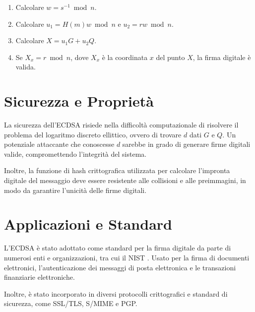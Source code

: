 \documentclass[a4paper,12pt]{report}
\begin{document}
\begin{enumerate}
    \item Calcolare $w = s^{-1} \bmod n$.
    \item Calcolare $u_1 = H(m)w \bmod n$ e $u_2 = rw \bmod n$.
    \item Calcolare $X = u_1G + u_2Q$.
    \item Se $X_x = r \bmod n$, dove $X_x$ è la coordinata $x$ del punto $X$, la firma digitale è valida.
\end{enumerate}

\section{Sicurezza e Proprietà}
La sicurezza dell'ECDSA risiede nella difficoltà computazionale di risolvere il problema del logaritmo discreto ellittico, ovvero di trovare $d$ dati $G$ e $Q$. Un potenziale attaccante che conoscesse $d$ sarebbe in grado di generare firme digitali valide, compromettendo l'integrità del sistema.

Inoltre, la funzione di hash crittografica utilizzata per calcolare l'impronta digitale del messaggio deve essere resistente alle collisioni e alle preimmagini, in modo da garantire l'unicità delle firme digitali.

\section{Applicazioni e Standard}
L'ECDSA è stato adottato come standard per la firma digitale da parte di numerosi enti e organizzazioni, tra cui il NIST \cite{nist}. Usato per la firma di documenti elettronici, l'autenticazione dei messaggi di posta elettronica e le transazioni finanziarie elettroniche.

Inoltre, è stato incorporato in diversi protocolli crittografici e standard di sicurezza, come SSL/TLS, S/MIME e PGP.


\nocite{*}


\end{document}
